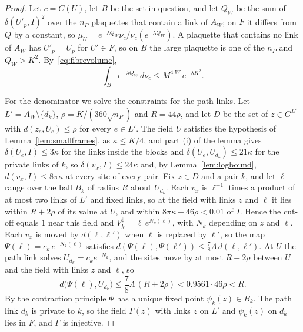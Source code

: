 \documentclass[11pt]{amsart}
\theoremstyle{definition}
\theoremstyle{remark}
\numberwithin{equation}{section}
\begin{document}
\begin{proof}
Let $c=C(U)$, let $B$ be the set in question, and let $Q_W$ be the sum of
$\delta(U'_p,I)^2$ over the $n_P$ plaquettes that contain a link of $A_W$; on
$F$ it differs from $Q$ by a constant, so $\mu_U=e^{-\lambda Q_W}\nu_c/
\nu_c(e^{-\lambda Q_W})$. A plaquette that contains no link of $A_W$ has
$U'_p=U_p$ for $U'\in F$, so on $B$ the large plaquette is one of the $n_P$
and $Q_W>K^2$. By~\eqref{eq:fibrevolume},
\[
\int_Be^{-\lambda Q_W}\,d\nu_c\le M^{4|W|}e^{-\lambda K^2}.
\]

For the denominator we solve the constraints for the path links. Let
$L'=A_W\setminus\{d_k\}$, $\rho=K/(360\sqrt{n_P})$ and $R=44\rho$, and let
$D$ be the set of $z\in G^{L'}$ with $d(z_e,U_e)\le\rho$ for every $e\in L'$.
The field $U$ satisfies the hypothesis of Lemma~\ref{lem:smallframes}, as
$\kappa\le K/4$, and part (i) of the lemma gives $\delta(U_e,I)\le3\kappa$ for
the links inside the blocks and $\delta(U_e,U_{d_k})\le21\kappa$ for the
private links of $k$, so $\delta(v_x,I)\le24\kappa$ and, by
Lemma~\ref{lem:logbound}, $d(v_x,I)\le8\pi\kappa$ at every site of every
pair. Fix $z\in D$ and a pair $k$, and let $\ell$ range over the ball $B_k$ of
radius $R$ about $U_{d_k}$. Each $v_x$ is $\ell^{-1}$ times a product of at
most two links of $L'$ and fixed links, so at the field with links $z$ and
$\ell$ it lies within $R+2\rho$ of its value at $U$, and within $8\pi\kappa
+46\rho<0.01$ of $I$. Hence the cut-off equals $1$ near this field and
$V^\sharp_k=\ell\,e^{N_k(\ell)}$, with $N_k$ depending on $z$ and $\ell$. Each
$v_x$ is moved by $d(\ell,\ell')$ when $\ell$ is replaced by $\ell'$, so the
map $\Psi(\ell)=c_k\,e^{-N_k(\ell)}$ satisfies $d(\Psi(\ell),\Psi(\ell'))\le
\frac78\Lambda\,d(\ell,\ell')$. At $U$ the path link solves
$U_{d_k}=c_ke^{-N_k}$, and the sites move by at most $R+2\rho$ between $U$
and the field with links $z$ and $\ell$, so
\[
d\bigl(\Psi(\ell),U_{d_k}\bigr)\le\frac78\Lambda\,(R+2\rho)<0.9561\cdot46
\rho<R .
\]
By the contraction principle $\Psi$ has a
unique fixed point $\psi_k(z)\in B_k$. The path link $d_k$ is private to $k$,
so the field $\Gamma(z)$ with links $z$ on $L'$ and $\psi_k(z)$ on $d_k$ lies
in $F$, and $\Gamma$ is injective.


\end{proof}
\end{document}
